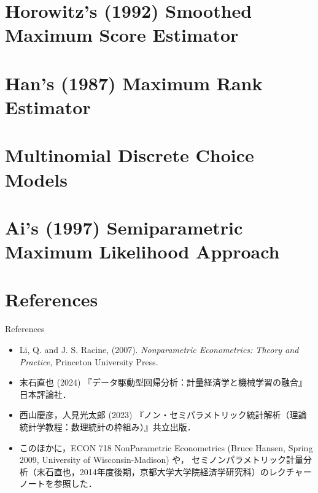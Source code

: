 \documentclass[xcolor=svgnames,dvipdfmx,cjk]{beamer}
\theoremstyle{example}
\begin{document}
\section{Horowitz's (1992) Smoothed Maximum Score Estimator}

\section{Han's (1987) Maximum Rank Estimator}

\section{Multinomial Discrete Choice Models}

\section{Ai's (1997) Semiparametric Maximum Likelihood Approach}


\section{References}

\begin{frame}{References}
  \begin{itemize}
    \item Li, Q. and J. S. Racine, (2007). 
          \textit{Nonparametric Econometrics: Theory and Practice,} 
          Princeton University Press.
    \item 末石直也 (2024) 『データ駆動型回帰分析：計量経済学と機械学習の融合』日本評論社．
    \item 西山慶彦，人見光太郎 (2023) 『ノン・セミパラメトリック統計解析（理論統計学教程：数理統計の枠組み）』共立出版．
    \item このほかに，ECON 718 NonParametric Econometrics (Bruce Hansen, Spring 2009, University of Wisconsin-Madison) や，
          セミノンパラメトリック計量分析（末石直也，2014年度後期，京都大学大学院経済学研究科）のレクチャーノートを参照した． 
  \end{itemize}
\end{frame}
\end{document}
